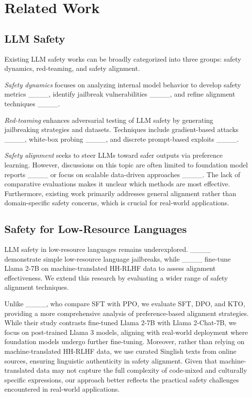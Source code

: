 \section{Related Work}
\label{sec:related_work}
\subsection{LLM Safety}
\label{sec:llm_safety}
Existing LLM safety works can be broadly categorized into three groups: safety dynamics, red-teaming, and safety alignment.

\textit{Safety dynamics} focuses on analyzing internal model behavior to develop safety metrics ____, identify jailbreak vulnerabilities ____, and refine alignment techniques ____.

\textit{Red-teaming} enhances adversarial testing of LLM safety by generating jailbreaking strategies and datasets. Techniques include gradient-based attacks ____, white-box probing ____, and discrete prompt-based exploits ____.

\textit{Safety alignment} seeks to steer LLMs toward safer outputs via preference learning. However, discussions on this topic are often limited to foundation model reports ____ or focus on scalable data-driven approaches ____. The lack of comparative evaluations makes it unclear which methods are most effective. Furthermore, existing work primarily addresses general alignment rather than domain-specific safety concerns, which is crucial for real-world applications.

\subsection{Safety for Low-Resource Languages}
\label{sec:low_res_safety}
LLM safety in low-resource languages remains underexplored. ____ demonstrate simple low-resource language jailbreaks, while ____ fine-tune Llama 2-7B on machine-translated HH-RLHF data to assess alignment effectiveness. We extend this research by evaluating a wider range of safety alignment techniques.

Unlike ____, who compare SFT with PPO, we evaluate SFT, DPO, and KTO, providing a more comprehensive analysis of preference-based alignment strategies. While their study contrasts fine-tuned Llama 2-7B with Llama 2-Chat-7B, we focus on post-trained Llama 3 models, aligning with real-world deployment where foundation models undergo further fine-tuning. Moreover, rather than relying on machine-translated HH-RLHF data, we use curated Singlish texts from online sources, ensuring linguistic authenticity in safety alignment. Given that machine-translated data may not capture the full complexity of code-mixed and culturally specific expressions, our approach better reflects the practical safety challenges encountered in real-world applications.


